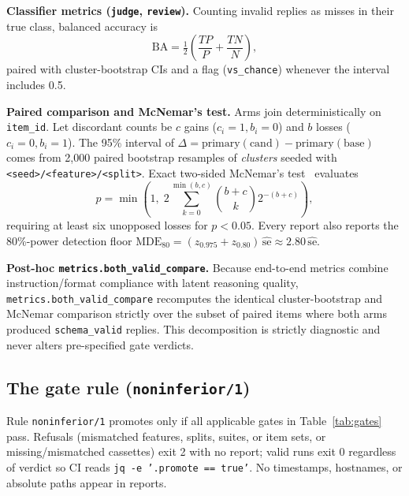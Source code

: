 \documentclass[conference]{IEEEtran}
\begin{document}
\textbf{Classifier metrics (\texttt{judge}, \texttt{review}).} Counting invalid replies as misses in their true class, balanced accuracy is
\begin{equation}
\mathrm{BA} = \tfrac{1}{2}\left(\frac{TP}{P} + \frac{TN}{N}\right),
\end{equation}
paired with cluster-bootstrap CIs and a flag (\texttt{vs\_\allowbreak{}chance}) whenever the interval includes 0.5.

\textbf{Paired comparison and McNemar's test.} Arms join deterministically on \texttt{item\_\allowbreak{}id}. Let discordant counts be $c$ gains ($c_i=1, b_i=0$) and $b$ losses ($c_i=0, b_i=1$). The 95\% interval of $\Delta = \text{primary}(\text{cand}) - \text{primary}(\text{base})$ comes from 2,000 paired bootstrap resamples of \emph{clusters} seeded with \texttt{<seed>/<feature>/<split>}. Exact two-sided McNemar's test~\cite{mcnemar1947} evaluates
\begin{equation}
p = \min\left(1,\; 2 \sum_{k=0}^{\min(b,c)} \binom{b+c}{k} 2^{-(b+c)}\right),
\end{equation}
requiring at least six unopposed losses for $p < 0.05$. Every report also reports the 80\%-power detection floor $\mathrm{MDE}_{80} = (z_{0.975} + z_{0.80})\,\widehat{\mathrm{se}} \approx 2.80\,\widehat{\mathrm{se}}$.

\textbf{Post-hoc \texttt{metrics.\allowbreak{}both\_\allowbreak{}valid\_\allowbreak{}compare}.} Because end-to-end metrics combine instruction/format compliance with latent reasoning quality, \texttt{metrics.\allowbreak{}both\_\allowbreak{}valid\_\allowbreak{}compare} recomputes the identical cluster-bootstrap and McNemar comparison strictly over the subset of paired items where both arms produced \texttt{schema\_\allowbreak{}valid} replies. This decomposition is strictly diagnostic and never alters pre-specified gate verdicts.

\subsection{The gate rule (\texttt{noninferior/1})}
\label{sec:design-gate}

Rule \texttt{noninferior/\allowbreak{}1} promotes only if all applicable gates in Table~\ref{tab:gates} pass. Refusals (mismatched features, splits, suites, or item sets, or missing/mismatched cassettes) exit 2 with no report; valid runs exit 0 regardless of verdict so CI reads \texttt{jq -{}e '.\allowbreak{}promote == true'}. No timestamps, hostnames, or absolute paths appear in reports.
\end{document}
